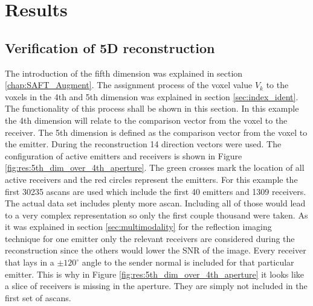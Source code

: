 \chapter{Results}
\label{chap:results}




\section{Verification of 5D reconstruction}
The introduction of the fifth dimension was explained in section \ref{chap:SAFT_Augment}. The assignment process of the  voxel value $V_k$ to the voxels in the 4th and 5th dimension was explained in section \ref{sec:index_ident}. The functionality of this process shall be shown in this section. In this example the 4th dimension will relate to the comparison vector from the voxel to the receiver. The 5th dimension is defined as the comparison vector from the voxel to the emitter. During the reconstruction 14 direction vectors were used. 
The configuration of active emitters and receivers is shown in Figure \ref{fig:res:5th_dim_over_4th_aperture}. The green crosses mark the location of all active receivers and the red circles represent the emitters. For this example the first 30235 \acp{ascan} are used which include the first 40 emitters and 1309 receivers. The actual data set includes plenty more \ac{ascan}. Including all of those would lead to a very complex representation so only the first couple thousand were taken. 
As it was explained in section \ref{sec:multimodality} for the reflection imaging technique for one emitter only the relevant receivers are considered during the reconstruction since the others would lower the SNR of the image. Every receiver that lays in a $\pm 120^{\circ}$ angle to the sender normal is included for that particular emitter. This is why in Figure \ref{fig:res:5th_dim_over_4th_aperture} it looks like a slice of receivers is missing in the aperture. They are simply not included in the first set of \acp{ascan}.

